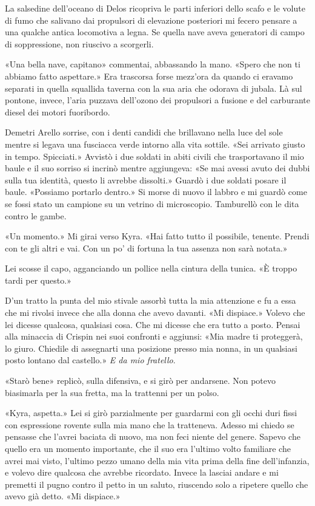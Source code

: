 La salsedine dell'oceano di Delos ricopriva le parti inferiori dello
scafo e le volute di fumo che salivano dai propulsori di elevazione
posteriori mi fecero pensare a una qualche antica locomotiva a legna. Se
quella nave aveva generatori di campo di soppressione, non riuscivo a
scorgerli.

«Una bella nave, capitano» commentai, abbassando la mano. «Spero che non
ti abbiamo fatto aspettare.» Era trascorsa forse mezz'ora da quando ci
eravamo separati in quella squallida taverna con la sua aria che odorava
di jubala. Là sul pontone, invece, l'aria puzzava dell'ozono dei
propulsori a fusione e del carburante diesel dei motori fuoribordo.

Demetri Arello sorrise, con i denti candidi che brillavano nella luce
del sole mentre si legava una fusciacca verde intorno alla vita sottile.
«Sei arrivato giusto in tempo. Spicciati.» Avvistò i due soldati in
abiti civili che trasportavano il mio baule e il suo sorriso si incrinò
mentre aggiungeva: «Se mai avessi avuto dei dubbi sulla tua identità,
questo li avrebbe dissolti.» Guardò i due soldati posare il baule.
«Possiamo portarlo dentro.» Si morse di nuovo il labbro e mi guardò come
se fossi stato un campione su un vetrino di microscopio. Tamburellò con
le dita contro le gambe.

«Un momento.» Mi girai verso Kyra. «Hai fatto tutto il possibile,
tenente. Prendi con te gli altri e vai. Con un po' di fortuna la tua
assenza non sarà notata.»

Lei scosse il capo, agganciando un pollice nella cintura della tunica.
«È troppo tardi per questo.»

D'un tratto la punta del mio stivale assorbì tutta la mia attenzione e
fu a essa che mi rivolsi invece che alla donna che avevo davanti. «Mi
dispiace.» Volevo che lei dicesse qualcosa, qualsiasi cosa. Che mi
dicesse che era tutto a posto. Pensai alla minaccia di Crispin nei suoi
confronti e aggiunsi: «Mia madre ti proteggerà, lo giuro. Chiedile di
assegnarti una posizione presso mia nonna, in un qualsiasi posto lontano
dal castello.» \emph{E da mio fratello}.

«Starò bene» replicò, sulla difensiva, e si girò per andarsene. Non
potevo biasimarla per la sua fretta, ma la trattenni per un polso.

«Kyra, aspetta.» Lei si girò parzialmente per guardarmi con gli occhi
duri fissi con espressione rovente sulla mia mano che la tratteneva.
Adesso mi chiedo se pensasse che l'avrei baciata di nuovo, ma non feci
niente del genere. Sapevo che quello era un momento importante, che il
suo era l'ultimo volto familiare che avrei mai visto, l'ultimo pezzo
umano della mia vita prima della fine dell'infanzia, e volevo dire
qualcosa che avrebbe ricordato. Invece la lasciai andare e mi premetti
il pugno contro il petto in un saluto, riuscendo solo a ripetere quello
che avevo già detto. «Mi dispiace.»

